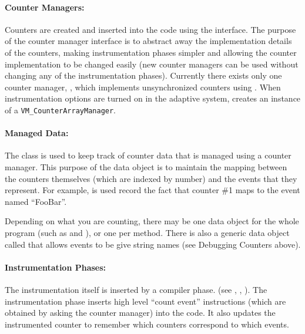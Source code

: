 \paragraph{Counter Managers:}  Counters are created and inserted into
the code using the 
interface.
The purpose of the counter manager interface is to abstract away the
implementation details of the counters, making instrumentation
phases simpler and allowing the counter implementation to be changed
easily (new counter managers can be used without changing any of the
instrumentation phases).  Currently there exists only one counter
manager, 
, which implements unsynchronized
counters using 
.  
When instrumentation options
are turned on in the adaptive system, 
creates an instance of a {\tt VM\_CounterArrayManager}.

\paragraph{Managed Data:} The class 
is used to
keep track of counter data that is managed using a counter
manager. This purpose of the data object is to maintain the mapping
between the counters themselves (which are indexed by number) and the
events that they represent.  For example, 
is used record the fact that counter \#1
maps to the event named ``FooBar''.  


Depending on what you are counting, there may be one data object for
the whole program (such as 
 and
), 
or one per method.  There is also a
generic data object called 
that
allows events to be give string names (see Debugging Counters above).

\paragraph{Instrumentation Phases:}  The instrumentation itself is
inserted by a compiler phase.  (see
,
,
).  The instrumentation phase
inserts high level ``count event'' instructions (which are obtained by
asking the counter manager) into the code.  It also updates the
instrumented counter to remember which counters correspond to which
events.

